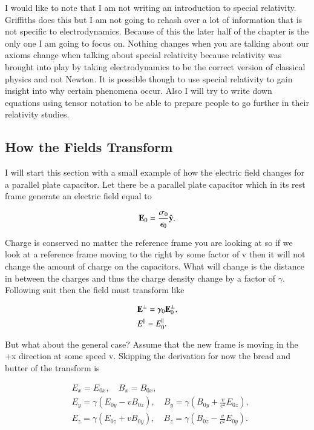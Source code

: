 \documentclass[preprint, review,12pt]{elsarticle}
\def\b{\textbf}
\def\9{\left(}
\def\0{\right)}
\newcommand{\hb}[1]{\hat{\b #1}}
\begin{document}
I would like to note that I am not writing an introduction to special relativity. Griffiths does this but I am not going to rehash over a lot of information that is not specific to electrodynamics. Because of this the later half of the chapter is the only one I am going to focus on. Nothing changes when you are talking about our axioms change when talking about special relativity because relativity was brought into play by taking electrodynamics to be the correct version of classical physics and not Newton. It is possible though to use special relativity to gain insight into why certain phenomena occur. Also I will try to write down equations using tensor notation to be able to prepare people to go further in their relativity studies.

\subsection{How the Fields Transform}

I will start this section with a small example of how the electric field changes for a parallel plate capacitor. Let there be a parallel plate capacitor which in its rest frame generate an electric field equal to 

\begin{equation}
    \b E_0 = \frac{\sigma_0}{\epsilon_0}\hb{y}.
\end{equation}

Charge is conserved no matter the reference frame you are looking at so if we look at a reference frame moving to the right by some factor of v then it will not change the amount of charge on the capacitors. What will change is the distance in between the charges and thus the charge density change by a factor of $\gamma$. Following suit then the field must transform like

\begin{equation}
\begin{split}
    & \b E^\bot = \gamma_0 \b E_0^\bot, \\
    & E^\parallel = E_0^\parallel. 
\end{split}
\end{equation}

But what about the general case? Assume that the new frame is moving in the +x direction at some speed v. Skipping the derivation for now the bread and butter of the transform is

\begin{equation}
\begin{split}
    & E_x = E_{0x}, \quad B_x = B_{0x}, \\
    & E_y = \gamma(E_{0y} - v B_{0z}), \quad B_y = \gamma \9 B_{0y} + \frac{v}{c^2} E_{0z} \0, \\
    & E_z = \gamma(E_{0z} + v B_{0y}), \quad B_z = \gamma \9 B_{0z} - \frac{v}{c^2}E_{0y} \0.
\end{split}
\end{equation}
\end{document}
